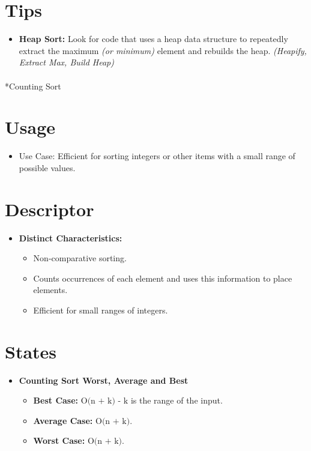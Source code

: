 \documentclass[
  letterpaper,
  DIV=11,
  numbers=noendperiod]{scrreprt}
\makeatletter
\let\oldparagraph\paragraph
\renewcommand{\paragraph}{
    \@ifstar
      \xxxParagraphStar
      \xxxParagraphNoStar
  }
\newcommand{\xxxParagraphStar}[1]{\oldparagraph*{#1}\mbox{}}
\newcommand{\xxxParagraphNoStar}[1]{\oldparagraph{#1}\mbox{}}
\providecommand{\tightlist}{%
  \setlength{\itemsep}{0pt}\setlength{\parskip}{0pt}}
\makeatother
\begin{document}
\section{Tips}

\begin{itemize}
\tightlist
\item
  \textbf{Heap Sort:} Look for code that uses a heap data structure to
  repeatedly extract the maximum \emph{(or minimum)} element and
  rebuilds the heap. \emph{(Heapify, Extract Max, Build Heap)}
\end{itemize}

\paragraph*{Counting Sort}\label{counting-sort}

\section{Usage}

\begin{itemize}
\tightlist
\item
  Use Case: Efficient for sorting integers or other items with a small
  range of possible values.
\end{itemize}

\section{Descriptor}

\begin{itemize}
\item
  \textbf{Distinct Characteristics:}

  \begin{itemize}
  \tightlist
  \item
    Non-comparative sorting.
  \item
    Counts occurrences of each element and uses this information to
    place elements.
  \item
    Efficient for small ranges of integers.
  \end{itemize}
\end{itemize}

\section{States}

\begin{itemize}
\item
  \textbf{Counting Sort Worst, Average and Best}

  \begin{itemize}
  \tightlist
  \item
    \textbf{Best Case:} \(\text{O(n ⁡+ k) - k}\) is the range of the
    input.
  \item
    \textbf{Average Case:} \(\text{O(n ⁡+ k)}\).
  \item
    \textbf{Worst Case:} \(\text{O(n ⁡+ k)}\).
  \end{itemize}
\end{itemize}
\end{document}
